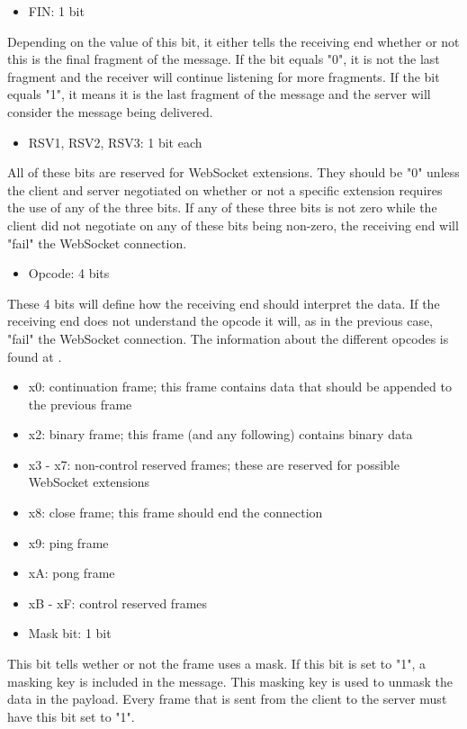 \documentclass[a4paper, 11pt]{report}
\begin{document}
	\begin{itemize}
		\item {FIN: 1 bit}
	\end{itemize}
Depending on the value of this bit, it either tells the receiving end whether or not this is the final fragment of the message. If the bit equals "0", it is not the last fragment and the receiver will continue listening for more fragments. If the bit equals "1", it means it is the last fragment of the message and the server will consider the message being delivered.
	\begin{itemize}
		\item {RSV1, RSV2, RSV3:  1 bit each}
	\end{itemize}
All of these bits are reserved for WebSocket extensions. They should be "0" unless the client and server negotiated on whether or not a specific extension requires the use of any of the three bits. If any of these three bits is not zero while the client did not negotiate on any of these bits being non-zero, the receiving end will "fail" the WebSocket connection.
	\begin{itemize}
		\item {Opcode:  4 bits}
	\end{itemize}
These 4 bits will define how the receiving end should interpret the data. If the receiving end does not understand the opcode it will, as in the previous case, "fail" the WebSocket connection. The information about the different opcodes is found at \cite{opcode}.
	\begin{itemize}
		\item[] {x0: continuation frame; this frame contains data that should be appended to the previous frame}
		\item[] {x2: binary frame; this frame (and any following) contains binary data}
		\item[] {x3 - x7: non-control reserved frames; these are reserved for possible WebSocket extensions}
		\item[] {x8: close frame; this frame should end the connection}
		\item[] {x9: ping frame}
		\item[] {xA: pong frame}
		\item[] {xB - xF: control reserved frames}
	\end{itemize}
	\begin{itemize}
		\item {Mask bit: 1 bit}
	\end{itemize}
This bit tells wether or not the frame uses a mask. If this bit is set to "1", a masking key is included in the message.  This masking key is used to unmask the data in the payload. Every frame that is sent from the client to the server must have this bit set to "1".
\end{document}
